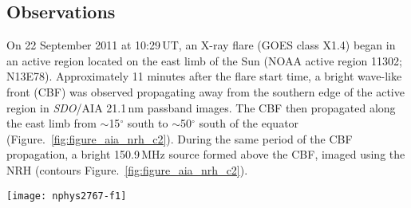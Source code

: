\subsection{Observations}
On 22 September 2011 at 10:29\,UT, an X-ray flare (GOES class X1.4) began in an active region located on the east limb of the Sun (NOAA active region 11302; N13E78). Approximately 11 minutes after the flare start time, a bright wave-like front (CBF) was observed propagating away from the southern edge of the active region in \emph{SDO}/AIA 21.1\,nm passband images. The CBF then propagated along the east limb from $\sim$15$^{\circ}\,$\,south to $\sim$50$^{\circ}\,$\,south of the equator (Figure.~\ref{fig:figure_aia_nrh_c2}). During the same period of the CBF propagation, a bright 150.9\,MHz source formed above the CBF, imaged using the NRH (contours Figure.~\ref{fig:figure_aia_nrh_c2}). 
%
%
\begin{sidewaysfigure}
    \centering
	\texttt{[image: nphys2767-f1]}
	\caption[Propagation of CBF and radio burst]{{\bf a-f} show that the 150\,MHz source follows closely the coronal bright front (CBF) as it propagates around the east limb, indicating they belong to a common structure. The intensity of the radio source is indicated by the colour bar on the right. {\bf c} reveals the role of the CME in the event, as observed by the LASCO C2 coronagraph. The combination of the white-light coronagraph (C2) and the EUV images (AIA) reveal the full spatial extent of the CME bubble i.e., the frontal structure in white-light has clear extensions back toward the solar surface, imaged at EUV. The location of the radio source and CBF show they clearly have a relationship with the southward CME flank \citep{carley2013}.}
	\label{fig:figure_aia_nrh_c2}
\end{sidewaysfigure}
%
%
